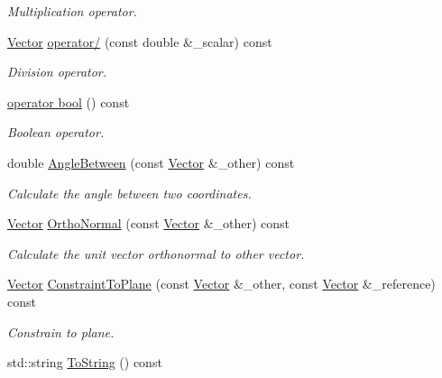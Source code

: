 \begin{DoxyCompactItemize}
\begin{DoxyCompactList}\small\item\em Multiplication operator. \end{DoxyCompactList}\item 
\hyperlink{classosse_1_1collaborate_1_1_vector}{Vector} \hyperlink{classosse_1_1collaborate_1_1_vector_aeaa64febdb5435cbd3c1e747e9920a11}{operator/} (const double \&\+\_\+scalar) const
\begin{DoxyCompactList}\small\item\em Division operator. \end{DoxyCompactList}\item 
\hyperlink{classosse_1_1collaborate_1_1_vector_adadeade94ada0735d117526a0f996c40}{operator bool} () const
\begin{DoxyCompactList}\small\item\em Boolean operator. \end{DoxyCompactList}\item 
double \hyperlink{classosse_1_1collaborate_1_1_vector_a992473ff0ed786e7891d7608ad99163b}{Angle\+Between} (const \hyperlink{classosse_1_1collaborate_1_1_vector}{Vector} \&\+\_\+other) const
\begin{DoxyCompactList}\small\item\em Calculate the angle between two coordinates. \end{DoxyCompactList}\item 
\hyperlink{classosse_1_1collaborate_1_1_vector}{Vector} \hyperlink{classosse_1_1collaborate_1_1_vector_a52ba4cdc72da4646b3868af7f51b100d}{Ortho\+Normal} (const \hyperlink{classosse_1_1collaborate_1_1_vector}{Vector} \&\+\_\+other) const
\begin{DoxyCompactList}\small\item\em Calculate the unit vector orthonormal to other vector. \end{DoxyCompactList}\item 
\hyperlink{classosse_1_1collaborate_1_1_vector}{Vector} \hyperlink{classosse_1_1collaborate_1_1_vector_a722c3aaf225c4324ff7939bd98827016}{Constraint\+To\+Plane} (const \hyperlink{classosse_1_1collaborate_1_1_vector}{Vector} \&\+\_\+other, const \hyperlink{classosse_1_1collaborate_1_1_vector}{Vector} \&\+\_\+reference) const
\begin{DoxyCompactList}\small\item\em Constrain to plane. \end{DoxyCompactList}\item 
std\+::string \hyperlink{classosse_1_1collaborate_1_1_vector_af5fb0bf89a48d682cfbfda512b5fb24d}{To\+String} () const

\end{DoxyCompactItemize}
